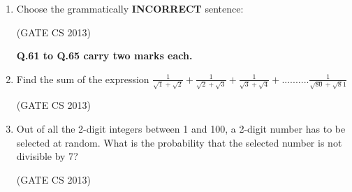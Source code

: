 \documentclass[a4paper, 11pt]{article}
\begin{document}
\begin{enumerate}
     \item Choose the grammatically \textbf{INCORRECT} sentence: 
     \begin{enumerate}
     \end{enumerate}
     \hfill (GATE CS 2013)

     \textbf{Q.61 to Q.65 carry two marks each. }\\

     \item Find the sum of the expression
     $\frac{1}{\sqrt{1}+\sqrt2}+\frac{1}{\sqrt{2}+\sqrt3}+\frac{1}{\sqrt{3}+\sqrt4}+..........\frac{1}{\sqrt{80}+\sqrt81}$
     \begin{enumerate}
     \end{enumerate}

     \hfill (GATE CS 2013)

     \item Out of all the 2-digit integers between 1 and 100, a 2-digit number has to be selected at random. What is the probability that the selected number is not divisible by 7?
     \begin{enumerate}
     \end{enumerate}

     \hfill (GATE CS 2013)


\end{enumerate}
\end{document}
